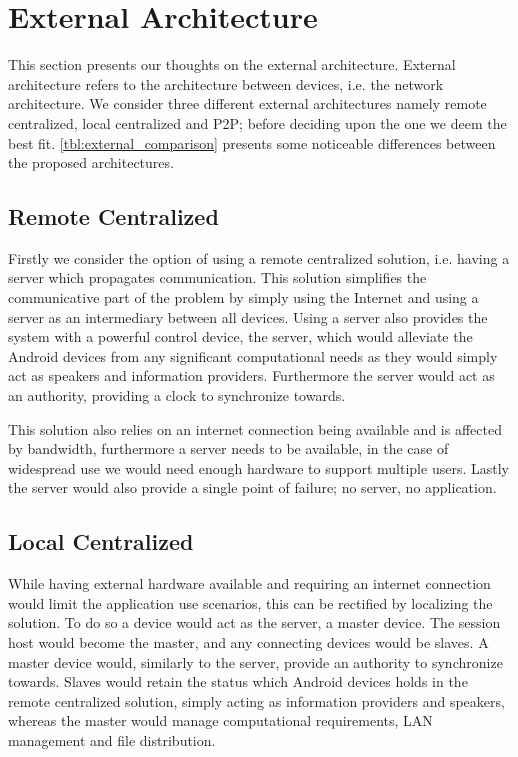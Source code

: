 \section{External Architecture}
This section presents our thoughts on the external architecture.
External architecture refers to the architecture between devices, i.e. the network architecture.
We consider three different external architectures namely remote centralized, local centralized and \ac{P2P}; before deciding upon the one we deem the best fit.
\cref{tbl:external_comparison} presents some  noticeable differences between the proposed architectures.

\subsection{Remote Centralized}
Firstly we consider the option of using a remote centralized solution, i.e. having a server which propagates communication.
This solution simplifies the communicative part of the problem by simply using the Internet and using a server as an intermediary between all devices.
Using a server also provides the system with a powerful control device, the server, which would alleviate the Android devices from any significant computational needs as they would simply act as speakers and information providers.
Furthermore the server would act as an authority, providing a clock to synchronize towards.

This solution also relies on an internet connection being available and is affected by bandwidth, furthermore a server needs to be available, in the case of widespread use we would need enough hardware to support multiple users.
Lastly the server would also provide a single point of failure; no server, no application.

\subsection{Local Centralized}
While having external hardware available and requiring an internet connection would limit the application use scenarios, this can be rectified by localizing the solution.
To do so a device would act as the server, a master device.
The session host would become the master, and any connecting devices would be slaves.
A master device would, similarly to the server, provide an authority to synchronize towards.
Slaves would retain the status which Android devices holds in the remote centralized solution, simply acting as information providers and speakers, whereas the master would manage computational requirements, LAN management and file distribution.

